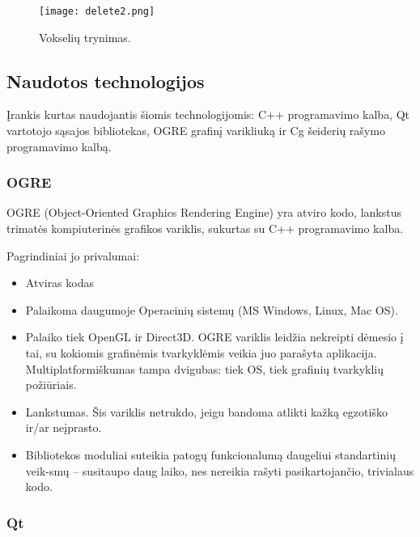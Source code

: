\begin{figure}[t]
\centering
\texttt{[image: delete2.png]}
\caption{Vokselių trynimas.}
\label{fig:delete_voxels2}
\end{figure}


\subsection{Naudotos technologijos}

Įrankis kurtas naudojantis šiomis technologijomis: C++ programavimo kalba, Qt
vartotojo sąsajos bibliotekas, OGRE grafinį varikliuką ir Cg šeiderių rašymo
programavimo kalbą.

\subsubsection{OGRE}

OGRE (Object-Oriented Graphics Rendering Engine) yra atviro kodo, lankstus
trimatės kompiuterinės grafikos variklis, sukurtas su C++ programavimo kalba.

Pagrindiniai jo privalumai:

\begin{itemize}

\item
  Atviras kodas

\item
  Palaikoma daugumoje Operacinių sistemų (MS Windows, Linux, Mac OS).

\item
  Palaiko tiek OpenGL ir Direct3D. OGRE variklis leidžia nekreipti dėmesio į
  tai, su kokiomis grafinėmis tvarkyklėmis veikia juo parašyta aplikacija.
  Multiplatformiškumas tampa dvigubas: tiek OS, tiek grafinių tvarkyklių
  požiūriais.

\item
  Lankstumas. Šis variklis netrukdo, jeigu bandoma atlikti kažką egzotiško
  ir/ar neįprasto.

\item
  Bibliotekos moduliai suteikia patogų funkcionalumą daugeliui standartinių
  veik-smų -- susitaupo daug laiko, nes nereikia rašyti pasikartojančio,
  trivialaus kodo.

\end{itemize}

\subsubsection{Qt}

